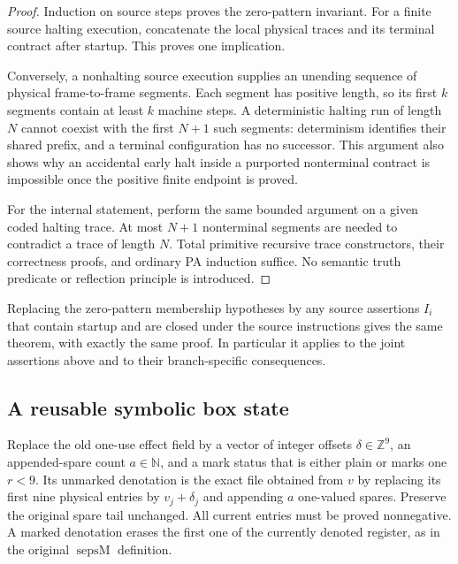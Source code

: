 \begin{proof}
Induction on source steps proves the zero-pattern invariant.  For a
finite source halting execution, concatenate the local physical traces
and its terminal contract after startup.  This proves one implication.

Conversely, a nonhalting source execution supplies an unending sequence
of physical frame-to-frame segments.  Each segment has positive
length, so its first $k$ segments contain at least $k$ machine steps.
A deterministic halting run of length $N$ cannot coexist with the first
$N+1$ such segments: determinism identifies their shared prefix, and
a terminal configuration has no successor.  This argument also shows
why an accidental early halt inside a purported nonterminal contract
is impossible once the positive finite endpoint is proved.

For the internal statement, perform the same bounded argument on a
given coded halting trace.  At most $N+1$ nonterminal segments are
needed to contradict a trace of length $N$.  Total primitive recursive
trace constructors, their correctness proofs, and ordinary PA
induction suffice.  No semantic truth predicate or reflection
principle is introduced.
\end{proof}

Replacing the zero-pattern membership hypotheses by any source
assertions $I_i$ that contain startup and are closed under the source
instructions gives the same theorem, with exactly the same proof.
In particular it applies to the joint assertions above and to their
branch-specific consequences.

\subsection{A reusable symbolic box state}

Replace the old one-use effect field by a vector of integer offsets
$\delta\in\mathbb Z^9$, an appended-spare count $a\in\mathbb N$, and
a mark status that is either plain or marks one $r<9$.  Its unmarked
denotation is the exact file obtained from $v$ by replacing its first
nine physical entries by $v_j+\delta_j$ and appending $a$ one-valued
spares.  Preserve the original spare tail unchanged.  All current
entries must be proved nonnegative.  A marked denotation erases the
first one of the currently denoted register, as in the original
$\operatorname{sepsM}$ definition.

